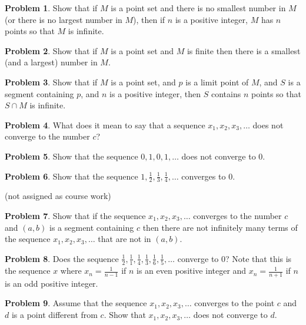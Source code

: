 \documentclass{article}
\theoremstyle{definition}
\newtheorem{problem}{Problem}
\begin{document}
\begin{problem}
Show that if $M$ is a point set and there is no smallest number in $M$ (or there is no largest number in $M$), then if $n$ is a positive integer, $M$ has $n$ points so that $M$ is infinite.
\end{problem}

\begin{problem}
Show that if $M$ is a point set and $M$ is finite then there is a smallest (and a largest) number in $M$.
\end{problem}

\begin{problem}
Show that if $M$ is a point set, and $p$ is a limit point of $M$, and $S$ is a segment containing $p$, and $n$ is a positive integer, then $S$ contains $n$ points so that $S \cap M$ is infinite.
\end{problem}

\begin{problem}
What does it mean to say that a sequence $x_1, x_2, x_3, \dots$ does not converge to the number $c$?
\end{problem}

\begin{problem}
Show that the sequence $0, 1, 0, 1, \dots$ does not converge to $0$.
\end{problem}

\begin{problem}
Show that the sequence $1, \frac{1}{2}, \frac{1}{3}, \frac{1}{4}, \dots$ converges to $0$.

(not assigned as course work)
\end{problem}

\begin{problem}
Show that if the sequence $x_1, x_2, x_3, \dots$ converges to the number $c$ and $(a, b)$ is a segment containing $c$ then there are not infinitely many terms of the sequence $x_1, x_2, x_3, \dots$ that are not in $(a, b)$.
\end{problem}

\begin{problem}
Does the sequence $\frac{1}{2}, \frac{1}{1}, \frac{1}{4}, \frac{1}{3}, \frac{1}{6}, \frac{1}{5}, \dots$ converge to $0$? Note that this is the sequence $x$ where $x_n = \frac{1}{n-1}$ if $n$ is an even positive integer and $x_n = \frac{1}{n+1}$ if $n$ is an odd positive integer.
\end{problem}

\begin{problem}
Assume that the sequence $x_1, x_2, x_3, \dots$ converges to the point $c$ and $d$ is a point different from $c$. Show that $x_1, x_2, x_3, \dots$ does not converge to $d$.
\end{problem}
\end{document}
